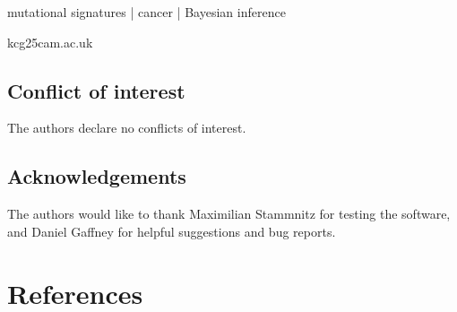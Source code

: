 \documentclass[times,twoside,twocolumn]{zHenriquesLab-StyleBioRxiv}
\begin{document}




\begin{keywords}
\setlength{\parindent}{0pt}
mutational signatures | cancer | Bayesian inference
\end{keywords}

\begin{corrauthor}
{kcg25\at cam.ac.uk}
\end{corrauthor}









\begingroup
\footnotesize
\subsection*{Conflict of interest}
The authors declare no conflicts of interest.

\subsection*{Acknowledgements}
The authors would like to thank Maximilian Stammnitz for testing the software, and Daniel Gaffney for helpful suggestions and bug reports.
\endgroup

\section*{References}



\end{document}
